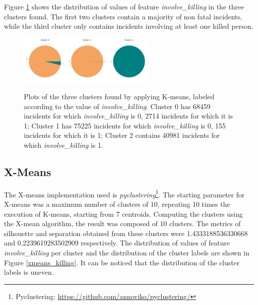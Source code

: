 \documentclass[10pt,a4paper]{report}
\begin{document}
Figure \ref{kmeans_killing} shows the distribution of values of feature \textit{involve\_killing} in the three clusters found.
The first two clusters contain a majority of non fatal incidents, while the third cluster only contains incidents involving at least one killed person.
\begin{figure}[h]
	\centering
	\includegraphics[width=0.2\textwidth]{kmeans_0}\includegraphics[width=0.2\textwidth]{kmeans_1}\includegraphics[width=0.2\textwidth]{kmeans_2}
	\caption{Plots of the three clusters found by applying K-means, labeled according to the value of \textit{involve\_killing}.
	Cluster 0 has 68459 incidents for which \textit{involve\_killing} is 0, 2714 incidents for which it is 1;
	Cluster 1 has 75225 incidents for which \textit{involve\_killing} is 0, 155 incidents for which it is 1;
	Cluster 2 contains 40981 incidents for which \textit{involve\_killing} is 1.}
	\label{kmeans_killing}
\end{figure}

\subsection{X-Means}

The X-means implementation used is \textit{pyclustering}\footnote{Pyclustering: \url{https://github.com/annoviko/pyclustering/}}.
The starting parameter for X-means was a maximum number of clusters of 10, repeating 10 times the execution of K-means, starting from 7 centroids.
Computing the clusters using the X-mean algorithm, the result was composed of 10 clusters.
The metrics of silhouette and separation obtained from these clusters were 1.4333188536330668 and 0.2239619283502909 respectively.
The distribution of values of feature \textit{involve\_killing} per cluster and the distribution of the cluster labels are shown in Figure \ref{xmeans_killing}.
It can be noticed that the distribution of the cluster labels is uneven.
\end{document}
